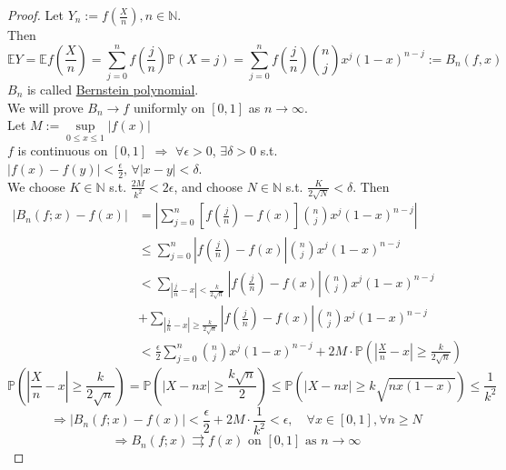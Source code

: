 \begin{proof}
    Let  $ Y_n:=f(\frac{X}{n}),n\in\mathbb{N} $.\\
    Then  \[\mathbb{E}Y=\mathbb{E}f(\frac{X}{n})=\sum\limits_{j=0 }^{n } f(\frac{j }{n })\mathbb{P}(X=j)=\sum\limits_{j=0 }^{n } f(\frac{j }{n })\binom{n }{j }x^j(1-x)^{n-j }:=B_n(f,x)\]
     $ B_n $  is called \underline{Bernstein polynomial}.\\
    We will prove  $ B_n\rightarrow f $ uniformly on  $ [0,1] $ as  $ n\rightarrow \infty $.\\
    Let  $ M:=\sup\limits_{0 \leqslant x \leqslant 1}|f(x)| $ \\
     $ f  $ is continuous on  $ [0,1] $  $ \Rightarrow  $  $ \forall \epsilon>0  $,  $ \exists \delta>0  $ s.t.  $ |f(x)-f(y)|<\frac{\epsilon}{2 },\,\forall |x-y|<\delta $.\\
     We choose  $ K\in \mathbb{N } $ s.t.  $ \frac{2M }{k^2 }<2\epsilon $, and choose  $ N\in\mathbb{N } $ s.t.  $ \frac{K }{2\sqrt{N}}<\delta $.
     Then 
     \begin{align*}
        |B_n(f;x)-f(x)|&=|\sum\limits_{j=0 }^{n } [f(\frac{j }{n })-f(x)]\binom{n }{j }x^j(1-x)^{n-j }|\\
         &\leqslant \sum\limits_{j=0 }^{n } |f(\frac{j }{n })-f(x)|\binom{n }{j }x^j(1-x)^{n-j }\\
         &<\sum\limits_{|\frac{j }{n}-x|<\frac{k }{2\sqrt{n}}} |f(\frac{j }{n })-f(x)|\binom{n }{j }x^j(1-x)^{n-j }\\
         &+\sum\limits_{|\frac{j }{n}-x|\geqslant \frac{k }{2\sqrt{n}}} |f(\frac{j }{n })-f(x)|\binom{n }{j }x^j(1-x)^{n-j }\\
         &<\frac{\epsilon}{2 }\sum\limits_{j=0 }^{n }\binom{n }{j }x^j(1-x)^{n-j }+2M\cdot\mathbb{P}(|\frac{X}{n}-x|\geqslant \frac{k }{2\sqrt{n}}) 
     \end{align*}
     \[\mathbb{P}(|\frac{X}{n}-x|\geqslant \frac{k }{2\sqrt{n}})=\mathbb{P}(|X-nx|\geqslant \frac{k\sqrt{n}}{2}) \leqslant \mathbb{P}(|X-nx|\geqslant k\sqrt{nx(1-x)}) \leqslant \frac{1 }{k^2}\]
     \[\Rightarrow |B_n(f;x)-f(x)|<\frac{\epsilon}{2 }+2M\cdot\frac{1 }{k^2 }<\epsilon,\quad\forall x\in [0,1],\forall n\geqslant N\]
     \[\Rightarrow B_n(f;x)\rightrightarrows f(x)\text{ on }[0,1]\text{ as }n\rightarrow\infty\]    
\end{proof} 
